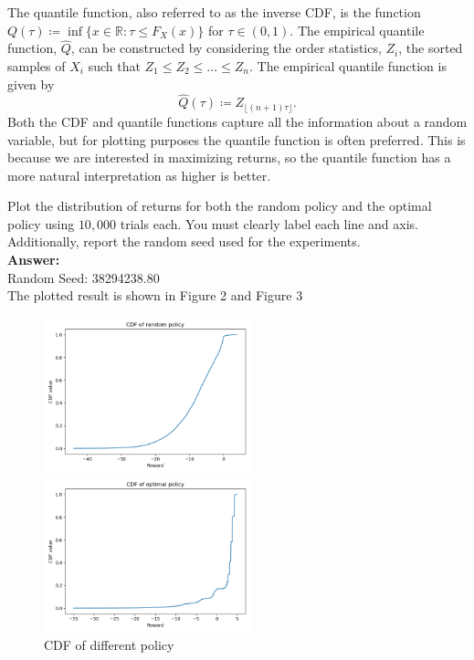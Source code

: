 \documentclass[]{article}
\begin{document}
\begin{enumerate}[label=\Alph*]
    The quantile function, also referred to as the inverse CDF, is the function $Q(\tau) \coloneqq \inf \{ x \in \mathbb{R} \colon \tau \le F_X(x) \}$ for $\tau \in (0,1)$. The empirical quantile function, $\hat Q$, can be constructed by considering the order statistics, $Z_i$, the sorted samples of $X_i$ such that $Z_1 \le Z_2 \le \dotsc \le Z_n$. The empirical quantile function is given by
    \begin{equation*}
        \hat Q(\tau) \coloneqq Z_{\lfloor (n+1)\tau \rfloor}.
    \end{equation*}
    Both the CDF and quantile functions capture all the information about a random variable, but for plotting purposes the quantile function is often preferred. This is because we are interested in maximizing returns, so the quantile function has a more natural interpretation as higher is better. 
    
    Plot the distribution of returns for both the random policy and the optimal policy using $10,\!000$ trials each. You must clearly label each line and axis. Additionally, report the random seed used for the experiments. \\
    \textbf{Answer: }\\
    Random Seed: 38294238.80\\
    The plotted result is shown in Figure 2 and Figure 3\\
    \begin{figure}
    \begin{minipage}[t]{0.5\textwidth}
    \centering
    \includegraphics[height=4.5cm,width=6cm]{fig/CDF_random.jpg}
    \end{minipage}
    \begin{minipage}[t]{0.5\textwidth}
    \centering
    \includegraphics[height=4.5cm,width=6cm]{fig/CDF_optimal.jpg}
    \end{minipage}
    \caption{CDF of different policy}
    \end{figure}


\end{enumerate}
\end{document}

